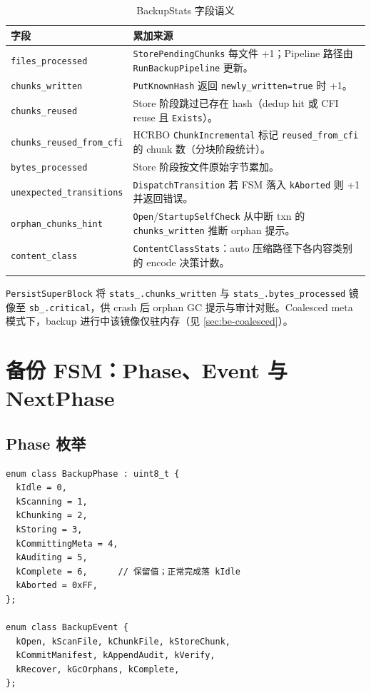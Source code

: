 \begin{longtable}{@{}p{4.2cm}p{9.2cm}@{}}
\toprule
\textbf{字段} & \textbf{累加来源} \\
\midrule
\endhead
\texttt{files\_processed} & \texttt{StorePendingChunks} 每文件 +1；Pipeline 路径由 \texttt{RunBackupPipeline} 更新。 \\
\texttt{chunks\_written} & \texttt{PutKnownHash} 返回 \texttt{newly\_written=true} 时 +1。 \\
\texttt{chunks\_reused} & Store 阶段跳过已存在 hash（dedup hit 或 CFI reuse 且 \texttt{Exists}）。 \\
\texttt{chunks\_reused\_from\_cfi} & HCRBO \texttt{ChunkIncremental} 标记 \texttt{reused\_from\_cfi} 的 chunk 数（分块阶段统计）。 \\
\texttt{bytes\_processed} & Store 阶段按文件原始字节累加。 \\
\texttt{unexpected\_transitions} & \texttt{DispatchTransition} 若 FSM 落入 \texttt{kAborted} 则 +1 并返回错误。 \\
\texttt{orphan\_chunks\_hint} & \texttt{Open}/\texttt{StartupSelfCheck} 从中断 txn 的 \texttt{chunks\_written} 推断 orphan 提示。 \\
\texttt{content\_class} & \texttt{ContentClassStats}：auto 压缩路径下各内容类别的 encode 决策计数。 \\
\bottomrule
\caption{BackupStats 字段语义}
\label{tab:backup-stats}
\end{longtable}

\begin{invariantbox}
\texttt{PersistSuperBlock} 将 \texttt{stats\_.chunks\_written} 与 \texttt{stats\_.bytes\_processed} 镜像至 \texttt{sb\_.critical}，供 crash 后 orphan GC 提示与审计对账。Coalesced meta 模式下，backup 进行中该镜像仅驻内存（见 \cref{sec:be-coalesced}）。
\end{invariantbox}

\section{备份 FSM：Phase、Event 与 NextPhase}
\label{sec:be-fsm}

\subsection{Phase 枚举}

\begin{lstlisting}[caption={BackupPhase 与 BackupEvent（\filepath{backup\_phase.h}）},label={lst:backup-phase-full}]
enum class BackupPhase : uint8_t {
  kIdle = 0,
  kScanning = 1,
  kChunking = 2,
  kStoring = 3,
  kCommittingMeta = 4,
  kAuditing = 5,
  kComplete = 6,      // 保留值；正常完成落 kIdle
  kAborted = 0xFF,
};

enum class BackupEvent {
  kOpen, kScanFile, kChunkFile, kStoreChunk,
  kCommitManifest, kAppendAudit, kVerify,
  kRecover, kGcOrphans, kComplete,
};
\end{lstlisting}

